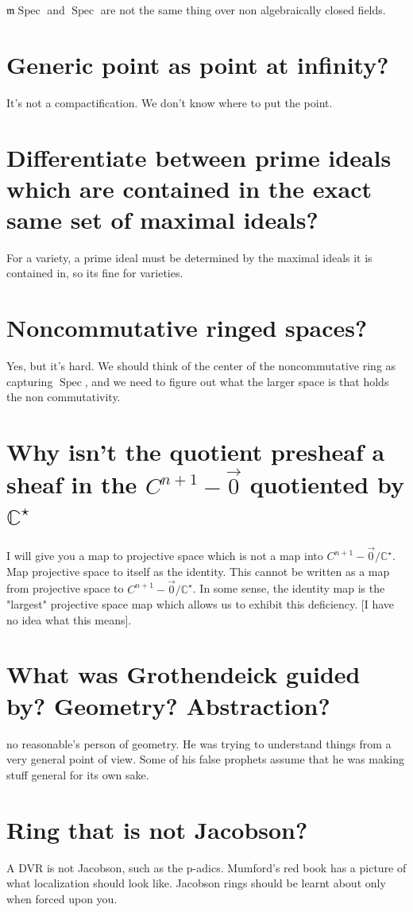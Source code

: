 \documentclass{book}
\newcommand{\C}{\ensuremath{\mathbb{C}}}
\newcommand{\spec}{\operatorname{Spec}}
\newcommand{\m}{\mathfrak{m}}
\newcommand{\mspec}{\m\operatorname{Spec}}
\theoremstyle{definition}
\begin{document}
$\mspec$ and $\spec$ are not the same thing over non algebraically closed
fields. 

\section{Generic point as point at infinity?}
It's not a compactification. We don't know where to put the point.


\section{Differentiate between prime ideals which are contained in the exact same set of maximal ideals?}
For a variety, a prime ideal must be determined by the maximal ideals it is
contained in, so its fine for varieties.

\section{Noncommutative ringed spaces?}
Yes, but it's hard. We should think of the center of the noncommutative ring
as capturing $\spec$, and we need to figure out what the larger space is that
holds the non commutativity.

\section{Why isn't the quotient presheaf a sheaf in the $C^{n+1} - \vec 0$ quotiented by $\C^\star$}
I will give you a map to projective space which is not a map into
$C^{n+1} - \vec 0/\C^\star$. Map projective space to itself as the identity. This
cannot be written as a map from projective space to $C^{n+1} - \vec 0/\C^\star$.
In some sense, the identity map is the "largest" projective space map which allows
us to exhibit this deficiency.  [I have no idea what this means].

\section{What was Grothendeick guided by? Geometry? Abstraction?}
no reasonable's person of geometry. He was trying to understand things from
a very general point of view. Some of his false prophets assume that he was
making stuff general for its own sake.


\section{Ring that is not Jacobson?}
A DVR is not Jacobson, such as the p-adics. Mumford's red book has a picture
of what localization should look like. Jacobson rings should be learnt about
only when forced upon you.
\end{document}
